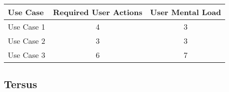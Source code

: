 


\begin{tabularx}{\textwidth}{Xcc}
\textbf{Use Case} & \textbf{Required User Actions} & \textbf{User Mental Load}\\
\hline
Use Case 1                          & 4 & 3 \\
Use Case 2                          & 3 & 3 \\
Use Case 3                          & 6 & 7
\end{tabularx}

\subsection*{Tersus}




